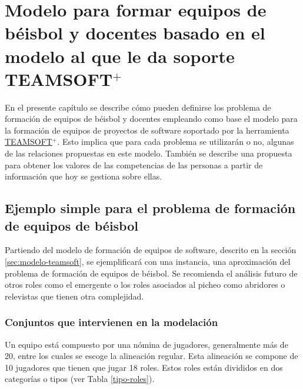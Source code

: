 \chapter{Modelo para formar equipos de béisbol y docentes basado en el modelo al que le da soporte TEAMSOFT$^+$}\label{chap:2}

En el presente capítulo se describe cómo pueden definirse los problema de formación de equipos de béisbol y docentes empleando como base el modelo para la formación de equipos de proyectos de software soportado por la herramienta \hyperref[sec:modelo-teamsoft]{TEAMSOFT$^+.$} Esto implica que para cada problema se utilizarán o no, algunas de las relaciones propuestas en este modelo. También se describe una propuesta para obtener los valores de las competencias de las personas a partir de información que hoy se gestiona sobre ellas.

\section{Ejemplo simple para el problema de formación de equipos de béisbol}\label{ejemplo-pel}

Partiendo del modelo de formación de equipos de software, descrito en la sección \ref{sec:modelo-teamsoft}, se ejemplificará con una instancia, una aproximación del problema de formación de equipos de béisbol. Se recomienda el análisis futuro de otros roles como el emergente o los roles asociados al picheo como abridores o relevistas que tienen otra complejidad.

\subsection{Conjuntos que intervienen en la modelación}\label{sec:conjuntos}
Un equipo está compuesto por una nómina de jugadores, generalmente más de 20, entre los cuales se escoge la alineación regular. Esta alineación se compone de 10 jugadores que tienen que jugar 18 roles. Estos roles están divididos en dos categorías o tipos (ver Tabla \ref{tipo-roles}).

